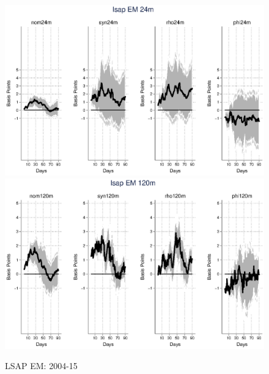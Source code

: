 \documentclass{article}
\begin{document}
\begin{figure}[tbph]
	\begin{center}
		\caption{LSAP EM: 2004-15}
		\includegraphics[trim={0cm 0cm 0cm 0cm},clip,height=0.5\textheight,width=1\textwidth]{../LagDep-FX/LSAP/EM/LSAPEM24m.eps} \\
		\includegraphics[trim={0cm 0cm 0cm 0cm},clip,height=0.5\textheight,width=1\textwidth]{../LagDep-FX/LSAP/EM/LSAPEM120m.eps} \\
	\end{center}
\end{figure}
\end{document}

